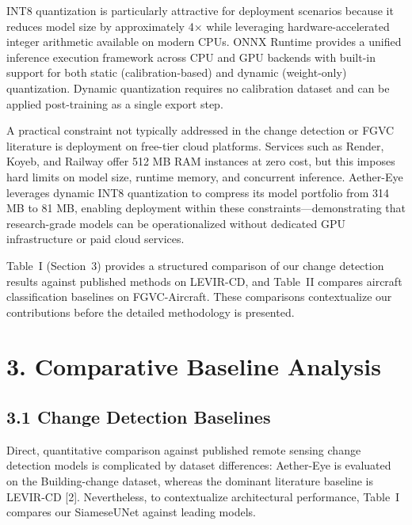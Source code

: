 \documentclass[11pt,a4paper]{article}
\begin{document}
INT8 quantization is particularly attractive for deployment scenarios because it reduces model size by approximately 4× while leveraging hardware-accelerated integer arithmetic available on modern CPUs. ONNX Runtime provides a unified inference execution framework across CPU and GPU backends with built-in support for both static (calibration-based) and dynamic (weight-only) quantization. Dynamic quantization requires no calibration dataset and can be applied post-training as a single export step.

A practical constraint not typically addressed in the change detection or FGVC literature is deployment on free-tier cloud platforms. Services such as Render, Koyeb, and Railway offer 512 MB RAM instances at zero cost, but this imposes hard limits on model size, runtime memory, and concurrent inference. Aether-Eye leverages dynamic INT8 quantization to compress its model portfolio from 314 MB to 81 MB, enabling deployment within these constraints---demonstrating that research-grade models can be operationalized without dedicated GPU infrastructure or paid cloud services.

Table~I (Section~3) provides a structured comparison of our change detection results against published methods on LEVIR-CD, and Table~II compares aircraft classification baselines on FGVC-Aircraft. These comparisons contextualize our contributions before the detailed methodology is presented.

\hypertarget{comparative-baseline-analysis}{%
\section{3. Comparative Baseline Analysis}\label{comparative-baseline-analysis}}

\hypertarget{change-detection-baselines}{%
\subsection{3.1 Change Detection Baselines}\label{change-detection-baselines}}

Direct, quantitative comparison against published remote sensing change detection models is complicated by dataset differences: Aether-Eye is evaluated on the Building-change dataset, whereas the dominant literature baseline is LEVIR-CD [2]. Nevertheless, to contextualize architectural performance, Table~I compares our SiameseUNet against leading models.
\end{document}
